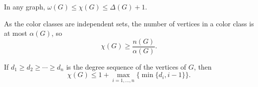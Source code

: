 
\begin{remark}
  In any graph,
  $\omega(G) \le \chi(G) \le \Delta(G)+1$.
\end{remark}

\begin{remark}
  As the color classes are independent sets, the number of vertices in a color
  class is at most $\alpha(G)$, so
  \[
	\chi(G) \ge \frac{n(G)}{\alpha(G)}.
  \]
\end{remark}

\begin{theorem}
  If $d_1 \ge d_2 \ge \cdots \ge d_n$ is the degree sequence of the vertices of
  $G$, then
  \[
	\chi(G) \le 1 + \max_{i=1, \ldots, n} \{ \min \{d_i, i-1\} \}.
  \]
\end{theorem}
